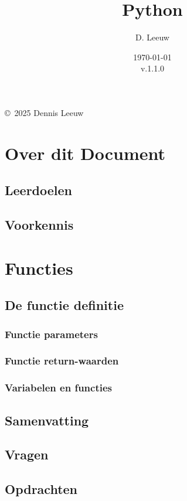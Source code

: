 \documentclass[a4paper,12pt,twoside,openright,titlepage]{book}
\author{D. Leeuw}
\title{Python}
\date{\today\\v.1.1.0}
\begin{document}

\maketitle

\copyright\ 2025 Dennis Leeuw\\




\frontmatter
\chapter{Over dit Document}
\section{Leerdoelen}

\section{Voorkennis}


\tableofcontents

\mainmatter

\chapter{Functies}

\section{De functie definitie}

\subsection{Functie parameters}

\subsection{Functie return-waarden}

\subsection{Variabelen en functies}

\section{Samenvatting}

\section{Vragen}

\section{Opdrachten}


\printindex
\end{document}
